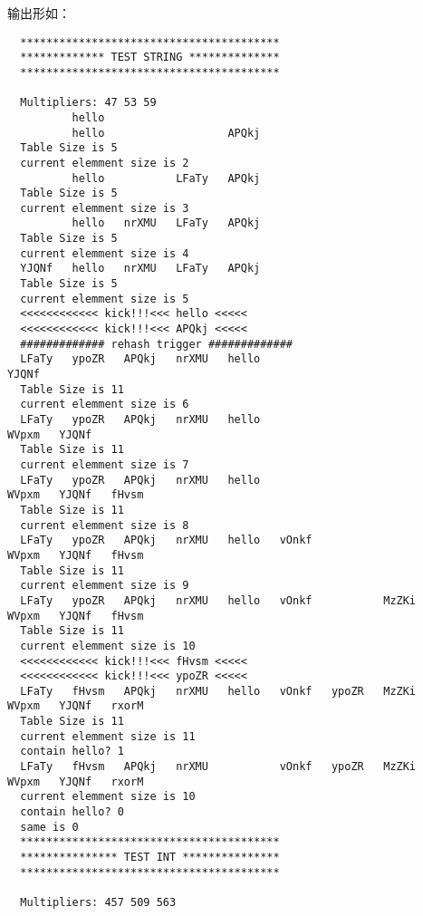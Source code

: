 \documentclass[UTF8]{ctexart}
\begin{document}
输出形如：
\begin{verbatim}
  ****************************************
  ************* TEST STRING **************
  ****************************************

  Multipliers: 47 53 59
          hello
          hello                   APQkj
  Table Size is 5
  current elemment size is 2
          hello           LFaTy   APQkj
  Table Size is 5
  current elemment size is 3
          hello   nrXMU   LFaTy   APQkj
  Table Size is 5
  current elemment size is 4
  YJQNf   hello   nrXMU   LFaTy   APQkj
  Table Size is 5
  current elemment size is 5
  <<<<<<<<<<<< kick!!!<<< hello <<<<<
  <<<<<<<<<<<< kick!!!<<< APQkj <<<<<
  ############# rehash trigger #############
  LFaTy   ypoZR   APQkj   nrXMU   hello                                   YJQNf
  Table Size is 11
  current elemment size is 6
  LFaTy   ypoZR   APQkj   nrXMU   hello                           WVpxm   YJQNf
  Table Size is 11
  current elemment size is 7
  LFaTy   ypoZR   APQkj   nrXMU   hello                           WVpxm   YJQNf   fHvsm
  Table Size is 11
  current elemment size is 8
  LFaTy   ypoZR   APQkj   nrXMU   hello   vOnkf                   WVpxm   YJQNf   fHvsm
  Table Size is 11
  current elemment size is 9
  LFaTy   ypoZR   APQkj   nrXMU   hello   vOnkf           MzZKi   WVpxm   YJQNf   fHvsm
  Table Size is 11
  current elemment size is 10
  <<<<<<<<<<<< kick!!!<<< fHvsm <<<<<
  <<<<<<<<<<<< kick!!!<<< ypoZR <<<<<
  LFaTy   fHvsm   APQkj   nrXMU   hello   vOnkf   ypoZR   MzZKi   WVpxm   YJQNf   rxorM
  Table Size is 11
  current elemment size is 11
  contain hello? 1
  LFaTy   fHvsm   APQkj   nrXMU           vOnkf   ypoZR   MzZKi   WVpxm   YJQNf   rxorM
  current elemment size is 10
  contain hello? 0
  same is 0
  ****************************************
  *************** TEST INT ***************
  ****************************************

  Multipliers: 457 509 563


\end{verbatim}
\end{document}
